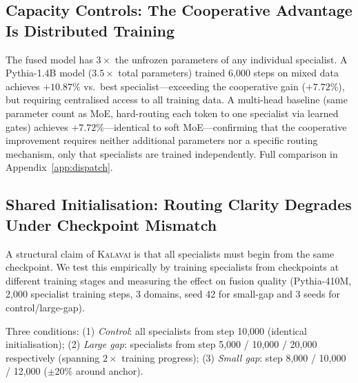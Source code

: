 \documentclass{article}
\newcommand{\kalavai}{\textsc{Kalavai}\xspace}
\begin{document}
\subsection{Capacity Controls: The Cooperative Advantage Is Distributed Training}
\label{sec:capacity}

The fused model has $3\times$ the unfrozen parameters of any individual specialist. A Pythia-1.4B model ($3.5\times$ total parameters) trained 6,000 steps on mixed data achieves $+10.87\%$ vs.\ best specialist---exceeding the cooperative gain ($+7.72\%$), but requiring centralised access to all training data. A multi-head baseline (same parameter count as MoE, hard-routing each token to one specialist via learned gates) achieves $+7.72\%$---identical to soft MoE---confirming that the cooperative improvement requires neither additional parameters nor a specific routing mechanism, only that specialists are trained independently. Full comparison in Appendix~\ref{app:dispatch}.

\subsection{Shared Initialisation: Routing Clarity Degrades Under Checkpoint Mismatch}
\label{sec:sharedinit}

A structural claim of \kalavai is that all specialists must begin from the same checkpoint. We test this empirically by training specialists from checkpoints at different training stages and measuring the effect on fusion quality (Pythia-410M, 2,000 specialist training steps, 3 domains, seed 42 for small-gap and 3 seeds for control/large-gap).

Three conditions: (1) \emph{Control}: all specialists from step 10,000 (identical initialisation); (2) \emph{Large gap}: specialists from step 5,000 / 10,000 / 20,000 respectively (spanning $2\times$ training progress); (3) \emph{Small gap}: step 8,000 / 10,000 / 12,000 ($\pm$20\% around anchor).
\end{document}
